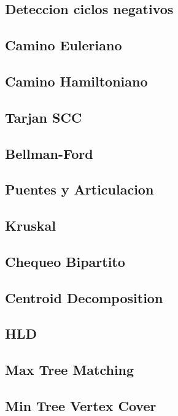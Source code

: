 \documentclass[a4paper,10pt,landscape,twocolumn]{article}
\begin{document}
\subsection{Deteccion ciclos negativos}

\subsection{Camino Euleriano}

\subsection{Camino Hamiltoniano}

\subsection{Tarjan SCC}

\subsection{Bellman-Ford}

\subsection{Puentes y Articulacion}

\subsection{Kruskal}

\subsection{Chequeo Bipartito}

\subsection{Centroid Decomposition}

\subsection{HLD}

\subsection{Max Tree Matching}

\subsection{Min Tree Vertex Cover}

\end{document}
